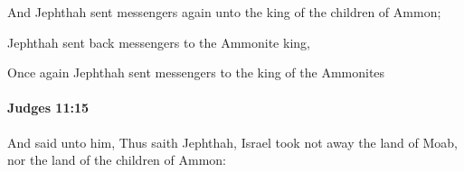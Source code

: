 			\begin{versebox}
					\item[BHS] 
					\item[ASV] And Jephthah sent messengers again unto the king of the children of Ammon;
					\item[NIV] Jephthah sent back messengers to the Ammonite king,
					\item[NRSV] Once again Jephthah sent messengers to the king of the Ammonites
			\end{versebox}

		\paragraph{Judges 11:15} %
			\label{JUDGES-11-15}

			And said unto him, Thus saith Jephthah, Israel took not away the land of Moab, nor the land of the children of Ammon:

